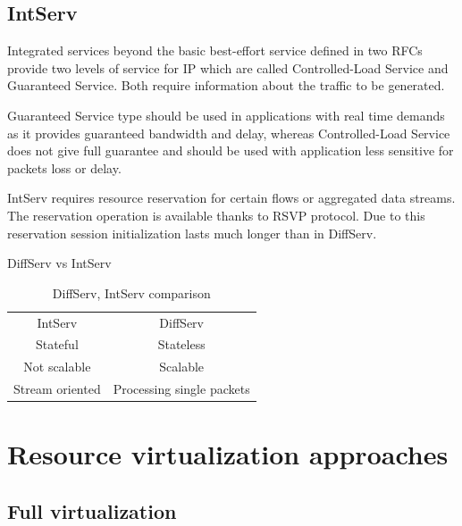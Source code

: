\documentclass[11pt]{book}
\begin{document}
      \subsection{IntServ}

        Integrated services beyond the basic best-effort service defined in two RFCs provide two levels of service for
        IP which are called Controlled-Load Service and Guaranteed Service. Both require information about the traffic
        to be generated. 

        Guaranteed Service type should be used in applications with real time demands as it provides guaranteed
        bandwidth and delay, whereas Controlled-Load Service does not give full guarantee and should be used with
        application less sensitive for packets loss or delay.

        IntServ requires resource reservation for certain flows or aggregated data streams. The reservation operation is
        available thanks to RSVP protocol. Due to this reservation session initialization lasts much longer than in
        DiffServ.

        {DiffServ vs IntServ}

        \begin{table}[ht]
          \caption{DiffServ, IntServ comparison}
          \centering %
          \begin{tabular}{c c}
            \hline \hline
            IntServ         & DiffServ \\
            Stateful        & Stateless \\
            Not scalable    & Scalable \\
            Stream oriented & Processing single packets \\
            \hline
          \end{tabular}
        \end{table}


    \section{Resource virtualization approaches}


      \subsection{Full virtualization}
\end{document}
